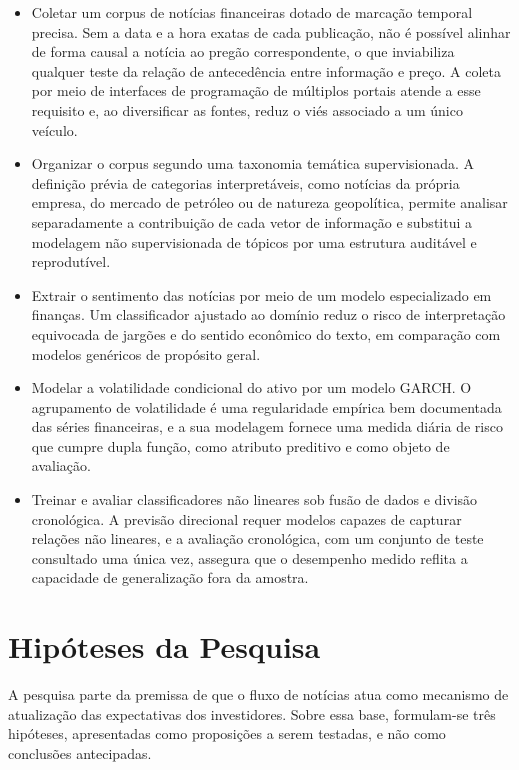 \begin{itemize}
    \item Coletar um corpus de notícias financeiras dotado de marcação temporal precisa. Sem a data e a hora exatas de cada publicação, não é possível alinhar de forma causal a notícia ao pregão correspondente, o que inviabiliza qualquer teste da relação de antecedência entre informação e preço. A coleta por meio de interfaces de programação de múltiplos portais atende a esse requisito e, ao diversificar as fontes, reduz o viés associado a um único veículo.
    \item Organizar o corpus segundo uma taxonomia temática supervisionada. A definição prévia de categorias interpretáveis, como notícias da própria empresa, do mercado de petróleo ou de natureza geopolítica, permite analisar separadamente a contribuição de cada vetor de informação e substitui a modelagem não supervisionada de tópicos por uma estrutura auditável e reprodutível.
    \item Extrair o sentimento das notícias por meio de um modelo especializado em finanças. Um classificador ajustado ao domínio reduz o risco de interpretação equivocada de jargões e do sentido econômico do texto, em comparação com modelos genéricos de propósito geral.
    \item Modelar a volatilidade condicional do ativo por um modelo GARCH. O agrupamento de volatilidade é uma regularidade empírica bem documentada das séries financeiras, e a sua modelagem fornece uma medida diária de risco que cumpre dupla função, como atributo preditivo e como objeto de avaliação.
    \item Treinar e avaliar classificadores não lineares sob fusão de dados e divisão cronológica. A previsão direcional requer modelos capazes de capturar relações não lineares, e a avaliação cronológica, com um conjunto de teste consultado uma única vez, assegura que o desempenho medido reflita a capacidade de generalização fora da amostra.
\end{itemize}

\section{Hipóteses da Pesquisa}

A pesquisa parte da premissa de que o fluxo de notícias atua como mecanismo de atualização das expectativas dos investidores. Sobre essa base, formulam-se três hipóteses, apresentadas como proposições a serem testadas, e não como conclusões antecipadas.

